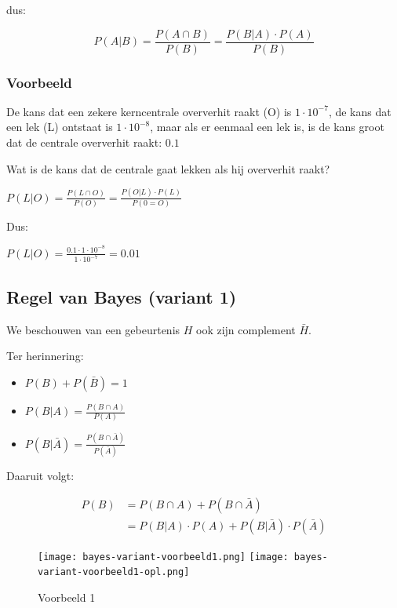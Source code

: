 \documentclass{article}
\begin{document}
dus:

\begin{equation}
    P(A | B) = \frac{P(A \cap B)}{P(B)} = \frac{P(B | A) \cdot P(A)}{P(B)}
\end{equation}

\subsubsection{Voorbeeld}

De kans dat een zekere kerncentrale oververhit raakt (O) is $1\cdot 10^{-7}$,
de kans dat een lek (L) ontstaat is $1\cdot 10^{-8}$, maar als er eenmaal
een lek is, is de kans groot dat de centrale oververhit raakt: $0.1$

Wat is de kans dat de centrale gaat lekken als hij oververhit raakt?

$P(L|O) = \frac{P(L\cap O)}{P(O)} = \frac{P(O|L)\cdot P(L)}{P(0=O)}$

Dus:

$P(L|O) = \frac{0.1 \cdot 1 \cdot 10^{-8}}{1\cdot 10^{-7}} = 0.01$


\subsection{Regel van Bayes (variant 1)}

We beschouwen van een gebeurtenis $H$ ook zijn complement $\bar{H}$.

Ter herinnering:

\begin{itemize}
    \item $P(B) + P(\bar{B}) = 1$
    \item $P(B|A) = \frac{P(B \cap A)}{P(A)}$
    \item $P(B|\bar{A}) = \frac{P(B \cap \bar{A})}{P(\bar{A})}$
\end{itemize}

Daaruit volgt:

\begin{equation}
    \begin{aligned}
        P(B) & = P(B \cap A) + P(B \cap \bar{A})\\
        & = P(B | A) \cdot P(A) + P(B | \bar{A}) \cdot P(\bar{A})
    \end{aligned}
\end{equation}

\begin{figure}[H]
    \centering
    \texttt{[image: bayes-variant-voorbeeld1.png]}
    \texttt{[image: bayes-variant-voorbeeld1-opl.png]}
    \caption{Voorbeeld 1}
\end{figure}
\end{document}
